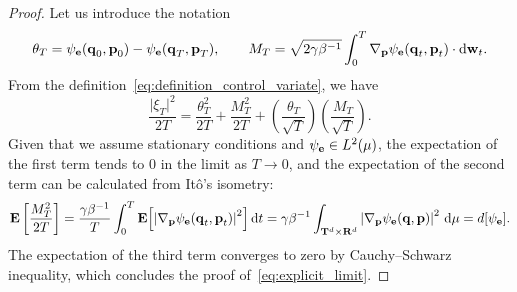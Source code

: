 \documentclass[11pt,a4paper]{article}
\begin{document}
\begin{proof}
    Let us introduce the notation
    \[
        \theta_T = \psi_{\boldsymbol{\mathbf e}}(\boldsymbol{\mathbf q}_0, \boldsymbol{\mathbf p}_0) - \psi_{\boldsymbol{\mathbf e}}(\boldsymbol{\mathbf q}_T, \boldsymbol{\mathbf p}_T),
        \qquad
        M_T = \sqrt{2 \gamma \beta^{-1}} \int_{0}^{T} \nabla_{\boldsymbol{\mathbf p}} \psi_{\boldsymbol{\mathbf e}}(\boldsymbol{\mathbf q}_t, \boldsymbol{\mathbf p}_t) \cdot \mathrm d \boldsymbol{\mathbf w}_t.
    \]
    From the definition~\eqref{eq:definition_control_variate},
    we have
    \[
        \frac{\lvert \xi_T \rvert^2}{2T} = \frac{\theta_T^2}{2T} + \frac{M_T^2}{2T} + \left(\frac{\theta_T}{\sqrt{T}}\right) \left(\frac{M_T}{\sqrt{T}}\right).
    \]
    Given that we assume stationary conditions and $\psi_{\boldsymbol{\mathbf e}} \in L^2(\mu)$,
    the expectation of the first term tends to 0 in the limit as $T \to 0$,
    and the expectation of the second term can be calculated from It\^o's isometry:
    \[
        \mathbf{E} \left[ \frac{M_T^2}{2T} \right]
        = \frac{\gamma \beta^{-1}}{T} \int_{0}^{T} \mathbf{E} \Bigl[\left\lvert \nabla_{\boldsymbol{\mathbf p}} \psi_{\boldsymbol{\mathbf e}}(\boldsymbol{\mathbf q}_t, \boldsymbol{\mathbf p}_t) \right\rvert^2\Bigr] \, \mathrm d t
        = \gamma \beta^{-1} \int_{\mathbf T^d \times \mathbf R^d} \left\lvert \nabla_{\boldsymbol{\mathbf p}} \psi_{\boldsymbol{\mathbf e}}(\boldsymbol{\mathbf q}, \boldsymbol{\mathbf p}) \right\rvert^2 \, \mathrm d \mu
        = d[\psi_{\boldsymbol{\mathbf e}}].
    \]
    The expectation of the third term converges to zero by Cauchy--Schwarz inequality,
    which concludes the proof of~\eqref{eq:explicit_limit}.
\end{proof}
\end{document}
